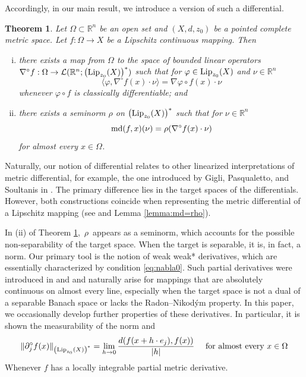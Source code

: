 \documentclass[reqno]{amsart}
\newtheorem{thm}{Theorem}[section]
\begin{document}
Accordingly, in our main result, we introduce a version of such a differential.
\begin{thm}\label{theorem:main}
Let $\Omega\subset \mathbb R^n$ be an open set and 
$(X, d, z_0)$ be a pointed complete metric space.
Let $f:\Omega\to X$ be a Lipschitz continuous mapping. Then
\begin{enumerate}[(i)]
\item there exists a map from $\Omega$ to the space of bounded linear operators 
$\nabla^{\circ}f:\Omega \to \mathcal L(\mathbb R^n; \left(\textnormal{Lip}_{z_0}(X)\right)^*)$
such that for $\varphi\in \textnormal{Lip}_{z_0}(X)$ and $\nu\in\mathbb R^n$
\begin{equation}
\langle \varphi, \nabla^{\circ}f(x)\cdot\nu \rangle = \nabla\varphi\circ f(x)\cdot\nu \label{eq:nabla0}
\end{equation}
whenever $\varphi\circ f$ is classically differentiable; and
\item there exists a seminorm $\rho$ on $\left(\textnormal{Lip}_{z_0}(X)\right)^*$
such that for $\nu\in\mathbb R^n$
\[
\textnormal{md}(f, x)(\nu) = \rho(\nabla^{\circ}f(x)\cdot\nu)
\]
for almost every $x\in\Omega$.
\end{enumerate}
\end{thm}
Naturally, our notion of differential relates to other linearized interpretations of metric differential,
for example, the one introduced by Gigli, Pasqualetto, and Soultanis in \cite{GPS2020}.
The primary difference lies in the target spaces of the differentials. 
However, both constructions coincide when representing the metric differential of a Lipschitz mapping
(see \cite[Theorem 4.7]{GPS2020} and Lemma \ref{lemma:md=rho}).

In (ii) of Theorem \ref{theorem:main}, $\rho$ appears as a seminorm, which accounts for the possible non-separability of the target space. When the target is separable, it is, in fact, a norm.
Our primary tool is the notion of weak weak* derivatives, which are essentially characterized by condition \eqref{eq:nabla0}. 
Such partial derivatives were introduced in \cite{CE:23} and \cite{CE:2021} and naturally arise for mappings that are absolutely continuous on almost every line, especially when the target space is not a dual of a separable Banach space or lacks the Radon–Nikodým property.
In this paper, we occasionally develop further properties of these derivatives. In particular, it is shown the measurability of the norm and 
\[
\|\partial_j^{\circ} f(x)\|_ {\left(\textnormal{Lip}_{z_0}(X)\right)^*} = 
\lim_{h\to 0} \frac{d(f(x+h\cdot e_j),f(x))}{|h|} \quad \text{ for almost every }  x\in\Omega
\]
Whenever $f$ has a locally integrable partial metric derivative.
\end{document}
